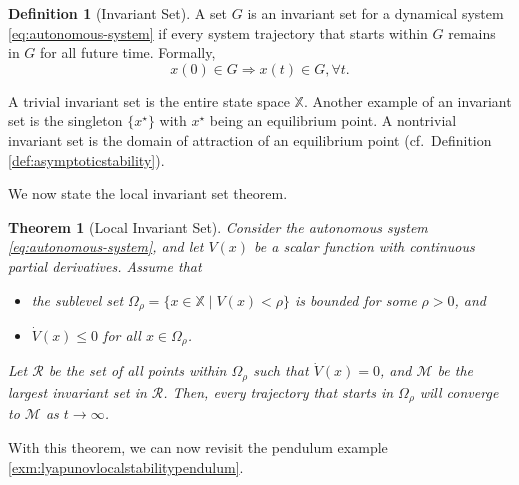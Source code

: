 \documentclass[
]{book}
\newtheorem{theorem}{Theorem}[chapter]
\theoremstyle{definition}
\newtheorem{definition}{Definition}[chapter]
\theoremstyle{definition}
\theoremstyle{definition}
\theoremstyle{definition}
\theoremstyle{remark}
\begin{document}
\begin{definition}[Invariant Set]
\protect\hypertarget{def:invariantset}{}\label{def:invariantset}A set \(G\) is an invariant set for a dynamical system \eqref{eq:autonomous-system} if every system trajectory that starts within \(G\) remains in \(G\) for all future time. Formally,
\[
x(0) \in G \Longrightarrow x(t) \in G,\forall t.
\]
\end{definition}

A trivial invariant set is the entire state space \(\mathbb{X}\). Another example of an invariant set is the singleton \(\{x^\star \}\) with \(x^\star\) being an equilibrium point. A nontrivial invariant set is the domain of attraction of an equilibrium point (cf.~Definition \ref{def:asymptoticstability}).

We now state the local invariant set theorem.

\begin{theorem}[Local Invariant Set]
\protect\hypertarget{thm:localinvariantsettheorm}{}\label{thm:localinvariantsettheorm}Consider the autonomous system \eqref{eq:autonomous-system}, and let \(V(x)\) be a scalar function with continuous partial derivatives. Assume that

\begin{itemize}
\item
  the sublevel set \(\Omega_{\rho} = \{ x \in \mathbb{X} \mid V(x) < \rho \}\) is bounded for some \(\rho > 0\), and
\item
  \(\dot{V}(x) \leq 0\) for all \(x \in \Omega_{\rho}\).
\end{itemize}

Let \(\mathcal{R}\) be the set of all points within \(\Omega_{\rho}\) such that \(\dot{V}(x) = 0\), and \(\mathcal{M}\) be the largest invariant set in \(\mathcal{R}\). Then, every trajectory that starts in \(\Omega_{\rho}\) will converge to \(\mathcal{M}\) as \(t \rightarrow \infty\).
\end{theorem}

With this theorem, we can now revisit the pendulum example \ref{exm:lyapunovlocalstabilitypendulum}.
\end{document}
